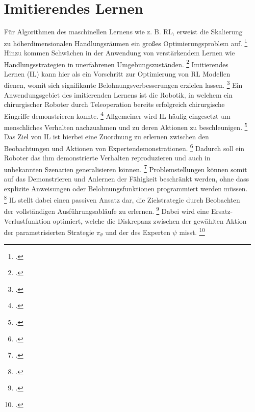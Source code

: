 \section{Imitierendes Lernen}

Für Algorithmen des maschinellen Lernens wie z. B. RL, erweist die Skalierung zu höherdimensionalen Handlungsräumen ein großes Optimierungsproblem auf. \footcite[Vgl.][S. 3]{Hussein.2017}
Hinzu kommen Schwächen in der Anwendung von verstärkendem Lernen wie Handlungsstrategien in unerfahrenen Umgebungszuständen. \footcite[Vgl.][S. 1]{attia.2018}
Imitierendes Lernen (IL) kann hier als ein Vorschritt zur Optimierung von RL Modellen dienen, womit sich signifikante Belohnungsverbesserungen erzielen lassen. \footcite[Vgl.][S. 4]{Hussein.2017}
Ein Anwendungsgebiet des imitierenden Lernens ist die Robotik, in welchem ein chirurgischer Roboter durch Teleoperation bereits erfolgreich chirurgische Eingriffe demonstrieren konnte. \footcite[Vgl.][]{gao.2014}
Allgemeiner wird IL häufig eingesetzt um menschliches Verhalten nachzuahmen und zu deren Aktionen zu beschleunigen. \footcite[Vgl.][S. 1]{attia.2018}
Das Ziel von IL ist hierbei eine Zuordnung zu erlernen zwischen den Beobachtungen und Aktionen von Expertendemonstrationen. \footcite[Vgl.][S. 1]{Hussein.2017}
Dadurch soll ein Roboter das ihm demonstrierte Verhalten reproduzieren und auch in unbekannten Szenarien generalisieren können. \footcite[Vgl.][S. 365]{fang.2019}
Problemstellungen können somit auf das Demonstrieren und Anlernen der Fähigkeit beschränkt werden, ohne dass explizite Anweisungen oder Belohnungsfunktionen programmiert werden müssen. \footcite[Vgl.][S. 1]{Hussein.2017}
IL stellt dabei einen passiven Ansatz dar, die Zielstrategie durch Beobachten der vollständigen Ausführungsabläufe zu erlernen. \footcite[Vgl.][S. 2]{attia.2018}
Dabei wird eine Ersatz-Verlustfunktion optimiert, welche die Diskrepanz zwischen der gewählten Aktion der parametrisierten Strategie $\pi_{\theta}$ und der des Experten $\psi$ misst. \footcite[Vgl.][S. 2f.]{Ashwin.2020}

